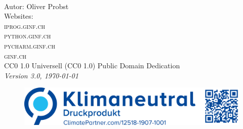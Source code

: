 
\newpage
~\vfill
\thispagestyle{empty}

\noindent Autor: Oliver Probst\\

\noindent Websites:\\
\noindent \textsc{iprog.ginf.ch}\\
\noindent \textsc{python.ginf.ch}\\
\noindent \textsc{pycharm.ginf.ch}\\
\noindent \textsc{ginf.ch}\\

\noindent \ccLogo \hspace{0.1cm} \ccZero \hspace{0.1cm} CC0 1.0 Universell (CC0 1.0) Public Domain Dedication \\

\noindent \textit{Version 3.0, \today}

\begin{figure}[htb]
\includegraphics[scale=0.15]{climate}
\end{figure}
